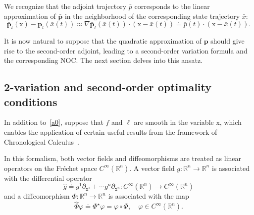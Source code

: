 \documentclass[sn-mathphys-num]{sn-jnl}
\numberwithin{equation}{section}
\theoremstyle{mythm}
\theoremstyle{mydef}
\renewcommand{\phi}{\varphi}
\begin{document}
We recognize that the adjoint trajectory \( \bar{p} \) corresponds to the linear approximation of \( \bar{\bm{p}} \) in the neighborhood of the corresponding state trajectory \( \bar{x} \):
\[
\bar{\bm{p}}_t(\mathrm{x}) - \bm{p}_t(\bar{x}(t)) \approx \nabla \bar{\bm{p}}_t(\bar{x}(t)) \cdot (\mathrm{x} - \bar{x}(t)) \doteq \bar{p}(t) \cdot (\mathrm{x} - \bar{x}(t)).
\]

It is now natural to suppose that the quadratic approximation of \( \bm{p} \) should give rise to the second-order adjoint, leading to a second-order variation formula and the corresponding NOC. The next section delves into this ansatz.




\subsection{2-variation and second-order optimality conditions}\label{ssec:2nd}

In addition to~\ref{a0}, suppose that \( f \) and \( \ell \) are smooth in the variable \( \mathrm{x} \), which enables the application of certain useful results from the framework of Chronological Calculus~\cite[Chapter~2]{agrachevControlTheoryGeometric2004}. 

In this formalism, both vector fields and diffeomorphisms are treated as linear operators on the Fr\'{e}chet space \( C^{\infty}(\mathbb{R}^n) \). A vector field \( g\colon \mathbb{R}^n\to \mathbb{R}^n  \) is associated with the differential operator 
  \[
    \widehat{g} \doteq g^1 \partial_{\mathrm{x}^1} + \cdots g^n \partial_{\mathrm{x}^n}\colon C^{\infty}(\mathbb{R}^n)\to C^{\infty}(\mathbb{R}^n)
  \]
  and a diffeomorphism \( \Phi\colon \mathbb{R}^n\to \mathbb{R}^n \) is associated with the map 
  \[
    \widehat{\Phi} \phi \doteq \Phi^\star\phi = \phi\circ \Phi, \quad \phi\in C^{\infty}(\mathbb{R}^n).
  \]
\end{document}
